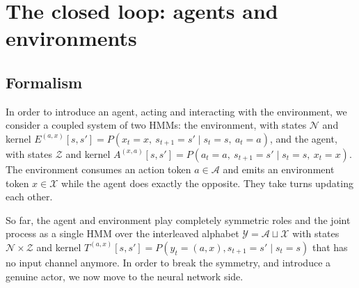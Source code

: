 \documentclass[11pt]{article}
\begin{document}
\section{The closed loop: agents and environments}
\label{sec:cmsp}

\subsection*{Formalism}

In order to introduce an agent, acting and interacting with the environment, we consider a coupled system of two HMMs: the environment, with states $\mathcal N$ and kernel $E^{(a,x)}[s,s'] = P(x_t = x,\ s_{t+1}=s' \mid s_t = s,\ a_t = a)$, and the agent, with states $\mathcal Z$ and kernel $A^{(x,a)}[s,s'] = P(a_t = a,\ s_{t+1}=s' \mid s_t = s,\ x_t = x)$. The environment consumes an action token $a \in \mathcal A$ and emits an environment token $x \in \mathcal X$ while the agent does exactly the opposite. They take turns updating each other.

So far, the agent and environment play completely symmetric roles and the joint process as a single HMM over the interleaved alphabet $\mathcal Y = \mathcal A \sqcup \mathcal X$ with states $\mathcal N \times \mathcal Z$ and kernel $T^{(a,x)}[s,s'] = P(y_t = (a,x), s_{t+1}=s' \mid s_t = s)$ that has no input channel anymore. In order to break the symmetry, and introduce a genuine actor, we now move to the neural network side.



\end{document}
